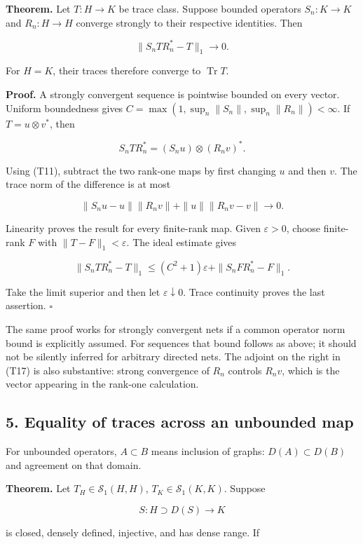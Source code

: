 \documentclass[
  11pt,
]{article}
\begin{document}
\textbf{Theorem.} Let \(T:H\to K\) be trace class. Suppose bounded
operators \(S_n:K\to K\) and \(R_n:H\to H\) converge strongly to their
respective identities. Then

\[
\|S_nTR_n^*-T\|_1\longrightarrow0.                           \tag{T17}
\]

For \(H=K\), their traces therefore converge to \(\operatorname{Tr}T\).

\textbf{Proof.} A strongly convergent sequence is pointwise bounded on
every vector. Uniform boundedness gives
\(C=\max(1,\sup_n\|S_n\|,\sup_n\|R_n\|)<\infty\). If \(T=u\otimes v^*\),
then

\[
S_nTR_n^*=(S_nu)\otimes(R_nv)^*.
\]

Using (T11), subtract the two rank-one maps by first changing \(u\) and
then \(v\). The trace norm of the difference is at most

\[
\|S_nu-u\|\|R_nv\|+\|u\|\|R_nv-v\|\longrightarrow0.
\]

Linearity proves the result for every finite-rank map. Given
\(\varepsilon>0\), choose finite-rank \(F\) with
\(\|T-F\|_1<\varepsilon\). The ideal estimate gives

\[
\|S_nTR_n^*-T\|_1
\leq(C^2+1)\varepsilon+\|S_nFR_n^*-F\|_1.
\]

Take the limit superior and then let \(\varepsilon\downarrow0\). Trace
continuity proves the last assertion. \(\square\)

The same proof works for strongly convergent nets if a common operator
norm bound is explicitly assumed. For sequences that bound follows as
above; it should not be silently inferred for arbitrary directed nets.
The adjoint on the right in (T17) is also substantive: strong
convergence of \(R_n\) controls \(R_nv\), which is the vector appearing
in the rank-one calculation.

\subsection{5. Equality of traces across an unbounded
map}\label{equality-of-traces-across-an-unbounded-map}

For unbounded operators, \(A\subset B\) means inclusion of graphs:
\(D(A)\subset D(B)\) and agreement on that domain.

\textbf{Theorem.} Let \(T_H\in\mathcal S_1(H,H)\),
\(T_K\in\mathcal S_1(K,K)\). Suppose

\[
S:H\supset D(S)\longrightarrow K
\]

is closed, densely defined, injective, and has dense range. If
\end{document}
